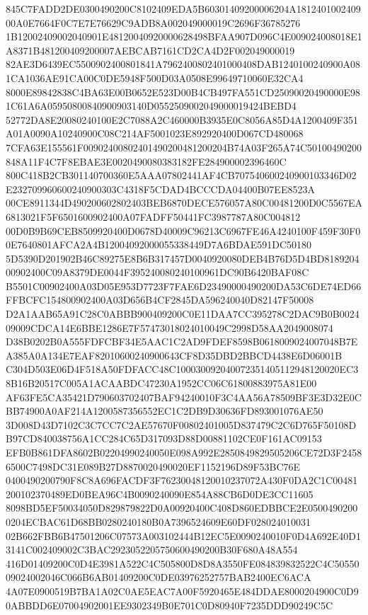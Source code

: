 \documentclass[UTF8,fontset=fandol,zihao=-4,a4paper]{ctexart}
\begin{document}
{{845C7FADD2DE0300490200C8102409EDA5B60301409200006204A181240100240900A0E7664F0C7E7E76629C9ADB8A002049000019C2696F36785276
1B12002409002040901E48120040920000628498BFAA907D096C4E009024008018E1A8371B481200409200007AEBCAB7161CD2CA4D2F002049000019
82AE3D6439EC5500902400801841A7962400802401000408DAB1240100240900A081CA1036AE91CA00C0DE5948F500D03A0508E99649710060E32CA4
8000E89842838C4BA63E00B0652E523D00B4CB497FA551CD25090020490000E981C61A6A05950800840900903140D0552509002049000019424BEBD4
52772DA8E20080240100E2C7088A2C460000B3935E0C8056A85D4A1200409F351A01A0090A10240900C08C214AF5001023E892920400D067CD480068
7CFA63E155561F00902400802401490200481200204B74A03F265A74C50100490200848A11F4C7F8EBAE3E0020490080383182FE284900002396460C
800C418B2CB301140700360E5AAA07802441AF4CB707540600240900103346D02E232709960600240900303C4318F5CDAD4BCCCDA04400B07EE8523A
00CE8911344D490200602802403BEB6870DECE576057A80C00481200D0C5567EA6813021F5F6501600902400A07FADFF50441FC3987787A80C004812
00D0B9B69CEB8509920400D0678D40009C96213C6967FE46A4240100F459F30F00E7640801AFCA2A4B12004092000055338449D7A6BDAE591DC50180
5D5390D201902B46C89275E8B6B317457D0040920080DEB4B76D5D4BD818920400902400C09A8379DE0044F395240080240100961DC90B6420BAF08C
B5501C00902400A03D05E953D7723F7FAE6D23490000490200DA53C6DE74ED66FFBCFC154800902400A03D656B4CF2845DA596240040D82147F50008
D2A1AAB65A91C28C0ABBB900409200C0E11DAA7CC395278C2DAC9B0B002409009CDCA14E6BBE1286E7F57473018024010049C2998D58AA2049008074
D38B0202B0A555FDFCBF34E5AAC1C2AD9FDEF8598B0618009024007048B7EA385A0A134E7EAF82010600240900643CF8D35DBD2BBCD4438E6D06001B
C304D503E06D4F518A50FDFACC48C100030092040072351405112948120020EC38B16B20517C005A1ACAABDC47230A1952CC06C61800883975A81E00
AF63FE5CA35421D790603702407BAF94240010F3C4AA56A78509BF3E3D32E0CBB74900A0AF214A1200587356552EC1C2DB9D30636FD893001076AE50
3D008D43D7102C3C7CC7C2AE57670F00802401005D837479C2C6D765F50108DB97CD840038756A1CC284C65D317093D88D00881102CE0F161AC09153
EFB0B861DFA8602B02204990240050E098A992E2850849829505206CE72D3F24586500C7498DC31E089B27D8870020490020EF1152196D89F53BC76E
0400490200790F8C8A696FACDF3F76230048120010237072A430F0DA2C1C00481200102370489ED0BEA96C4B0090240090E854A88CB6D0DE3CC11605
8098BD5EF50034050D829879822D0A00920400C408D860EDBBCE2E05004902000204ECBAC61D68BB0280240180B0A7396524609E60DF028024010031
02B662FBB6B47501206C07573A003102444B12EC5E0090240010F0D4A692E40D13141C002409002C3BAC2923052205750600490200B30F680A48A554
416D01409200C0D4E3981A522C4C505800D8D8A3550FE084839832522C4C5055009024002046C066B6AB01409200C0DE03976252757BAB2400EC6ACA
4A07E0900519B7BA1A02C0AE5EAC7A00F5920465E484DDAE8000204900C0D90ABBDD6E07004902001EE9302349B0E701C0D80940F7235DDD90249C5C
}}
\end{document}
